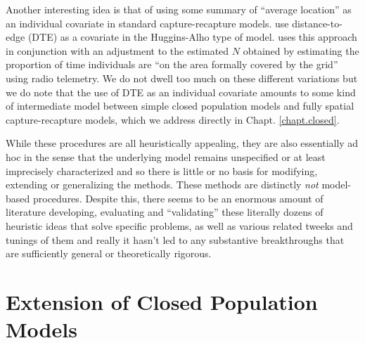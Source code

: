 Another interesting idea is that of using some summary of ``average
location'' as an individual covariate in standard capture-recapture
models. \citet{boulanger_mclellan:2001} use distance-to-edge (DTE) as
a covariate in the Huggins-Alho type of model. \citet{ivan:2012} uses
this approach in conjunction with an adjustment to the estimated $N$
obtained by estimating the proportion of time individuals are ``on the
area formally covered by the grid'' using radio telemetry.  We do not
dwell too much on these different variations but we do note that the
use of DTE as an individual covariate amounts to some kind of
intermediate model between simple closed population models and fully
spatial capture-recapture models, which we address directly in
Chapt. \ref{chapt.closed}.


While these procedures are all heuristically appealing, they are also
essentially ad hoc in the sense that the underlying model remains
unspecified or at least imprecisely characterized and so there is
little or no basis for modifying, extending or generalizing the
methods. These methods are distinctly {\it not} model-based
procedures.  Despite this, there seems to be an enormous amount of
literature developing, evaluating and ``validating'' these literally
dozens of heuristic ideas that solve specific problems, as well as
various related tweeks and tunings of them and really it hasn't led to
any substantive breakthroughs that are sufficiently general or
theoretically rigorous.






\section{Extension of Closed Population Models}



